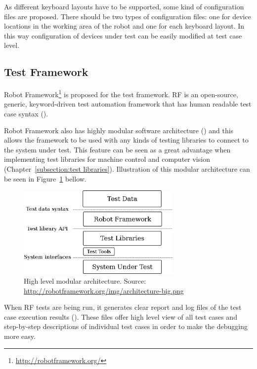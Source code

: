 As different keyboard layouts have to be supported, some kind of configuration files are proposed. There should be two types of configuration files: one for device locations in the working area of the robot and one for each keyboard layout. In this way configuration of devices under test can be easily modified at test case level.

\FloatBarrier
\subsection{Test Framework}

Robot Framework\footnote{\url{http://robotframework.org/}} is proposed for the test framework. RF is an open-source, generic, keyword-driven test automation framework that has human readable test case syntax (\emph{\cite{Rfuserguide}}).

Robot Framework also has highly modular software architecture (\emph{\cite{Rfuserguide}}) and this allows the framework to be used with any kinds of testing libraries to connect to the system under test. This feature can be seen as a great advantage when implementing test libraries for machine control and computer vision (Chapter~\ref{subsection:test libraries}). Illustration of this modular architecture can be seen in Figure~\ref{fig:modular_architecture} bellow.

\begin{figure}[ht]
  \begin{center}
    \includegraphics[width=8cm]{images/architecture-big.png}
    \caption{High level modular architecture. Source: \url{http://robotframework.org/img/architecture-big.png}}
    \label{fig:modular_architecture}
  \end{center}
\end{figure}

When RF tests are being run, it generates clear report and log files of the test case execution results (\emph{\cite{Rfuserguide}}). These files offer high level view of all test cases and step-by-step descriptions of individual test cases in order to make the debugging more easy.

